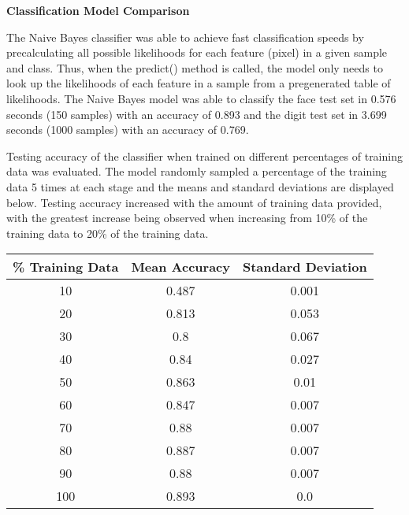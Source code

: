 \documentclass[11pt]{article}
\begin{document}
    \begin{center}
        \Large
        \textbf{Classification Model Comparison}
    \end{center}
    \normalsize
    
    The Naive Bayes classifier was able to achieve fast classification speeds by precalculating all possible likelihoods for each feature (pixel) in a given sample and class. Thus, when the predict() method is called, the model only needs to look up the likelihoods of each feature in a sample from a pregenerated table of likelihoods. The Naive Bayes model was able to classify the face test set in 0.576 seconds (150 samples) with an accuracy of 0.893 and the digit test set in 3.699 seconds (1000 samples) with an accuracy of 0.769.

    Testing accuracy of the classifier when trained on different percentages of training data was evaluated. The model randomly sampled a percentage of the training data 5 times at each stage and the means and standard deviations are displayed below. Testing accuracy increased with the amount of training data provided, with the greatest increase being observed when increasing from 10\% of the training data to 20\% of the training data.
    
    \begin{center}
    \begin{tabular}{||c c c||} 
     \hline
     \% Training Data & Mean Accuracy & Standard Deviation \\ [0.5ex] 
     \hline\hline
     10 & 0.487 & 0.001 \\ 
     \hline
     20 & 0.813 & 0.053 \\ 
     \hline
     30 & 0.8 & 0.067 \\ 
     \hline
     40 & 0.84 & 0.027 \\ 
     \hline
     50 & 0.863 & 0.01 \\ 
     \hline
     60 & 0.847 & 0.007 \\ 
     \hline
     70 & 0.88 & 0.007 \\ 
     \hline
     80 & 0.887 & 0.007 \\ 
     \hline
     90 & 0.88 & 0.007 \\ 
     \hline
     100 & 0.893 & 0.0 \\ 
     \hline
    \end{tabular}
    \end{center}
\end{document}
